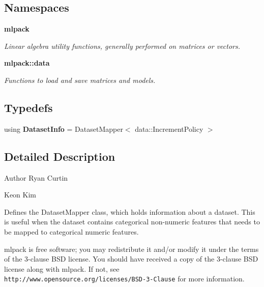 \subsection*{Namespaces}
\begin{DoxyCompactItemize}
\item 
 \textbf{ mlpack}
\begin{DoxyCompactList}\small\item\em Linear algebra utility functions, generally performed on matrices or vectors. \end{DoxyCompactList}\item 
 \textbf{ mlpack\+::data}
\begin{DoxyCompactList}\small\item\em Functions to load and save matrices and models. \end{DoxyCompactList}\end{DoxyCompactItemize}
\subsection*{Typedefs}
\begin{DoxyCompactItemize}
\item 
using \textbf{ Dataset\+Info} = Dataset\+Mapper$<$ data\+::\+Increment\+Policy $>$
\end{DoxyCompactItemize}


\subsection{Detailed Description}
\begin{DoxyAuthor}{Author}
Ryan Curtin 

Keon Kim
\end{DoxyAuthor}
Defines the Dataset\+Mapper class, which holds information about a dataset. This is useful when the dataset contains categorical non-\/numeric features that needs to be mapped to categorical numeric features.

mlpack is free software; you may redistribute it and/or modify it under the terms of the 3-\/clause B\+SD license. You should have received a copy of the 3-\/clause B\+SD license along with mlpack. If not, see {\tt http\+://www.\+opensource.\+org/licenses/\+B\+S\+D-\/3-\/\+Clause} for more information. 